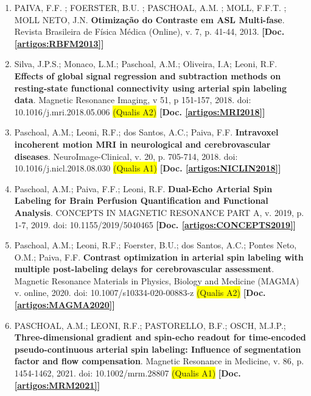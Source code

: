 \documentclass[a4paper,oneside,10pt]{article}
\begin{document}
\begin{enumerate}
        \renewcommand{\labelenumi}{{\large\bfseries\arabic{enumi}.}}
        
        \item PAIVA, F.F. ; FOERSTER, B.U. ; PASCHOAL, A.M. ; MOLL, F.F.T. ; MOLL NETO, J.N. \textbf{Otimização do Contraste em ASL Multi-fase}. Revista Brasileira de Física Médica (Online), v. 7, p. 41-44, 2013.  \textbf{[Doc. \ref{artigos:RBFM2013}]}
        
        \item Silva, J.P.S.; Monaco, L.M.; Paschoal, A.M.; Oliveira, I.A; Leoni, R.F. \textbf{Effects of global signal regression and subtraction methods on resting-state functional connectivity using arterial spin labeling data}. Magnetic Resonance Imaging, v 51, p 151-157, 2018. doi: 10.1016/j.mri.2018.05.006 \colorbox{yellow}{(Qualis A2)} \textbf{[Doc. \ref{artigos:MRI2018}]}
        
        \item Paschoal, A.M.; Leoni, R.F.; dos Santos, A.C.; Paiva, F.F. \textbf{Intravoxel incoherent motion MRI in neurological and cerebrovascular diseases}. NeuroImage-Clinical, v. 20, p. 705-714, 2018. doi: 10.1016/j.nicl.2018.08.030 \colorbox{yellow}{(Qualis A1)} \textbf{[Doc. \ref{artigos:NICLIN2018}]}
        
        \item Paschoal, A.M.; Paiva, F.F.; Leoni, R.F. \textbf{Dual-Echo Arterial Spin Labeling for Brain Perfusion Quantification and Functional Analysis}. CONCEPTS IN MAGNETIC RESONANCE PART A, v. 2019, p. 1-7, 2019. doi: 10.1155/2019/5040465 \textbf{[Doc. \ref{artigos:CONCEPTS2019}]}

        \item Paschoal, A.M.; Leoni, R.F.; Foerster, B.U.; dos Santos, A.C.; Pontes Neto, O.M.; Paiva, F.F. \textbf{Contrast optimization in arterial spin labeling with multiple post-labeling delays for cerebrovascular assessment}. Magnetic Resonance Materials in Physics, Biology and Medicine (MAGMA) v. online, 2020. doi: 10.1007/s10334-020-00883-z \colorbox{yellow}{(Qualis A2)} \textbf{[Doc. \ref{artigos:MAGMA2020}]}
        
        \item PASCHOAL, A.M.; LEONI, R.F.; PASTORELLO, B.F.; OSCH, M.J.P.; \textbf{Three-dimensional gradient and spin-echo readout for time-encoded pseudo-continuous arterial spin labeling: Influence of segmentation factor and flow compensation}. Magnetic Resonance in Medicine, v. 86, p. 1454-1462, 2021. doi: 10.1002/mrm.28807 \colorbox{yellow}{(Qualis A1)} \textbf{[Doc. \ref{artigos:MRM2021}]}
        

\end{enumerate}
\end{document}

